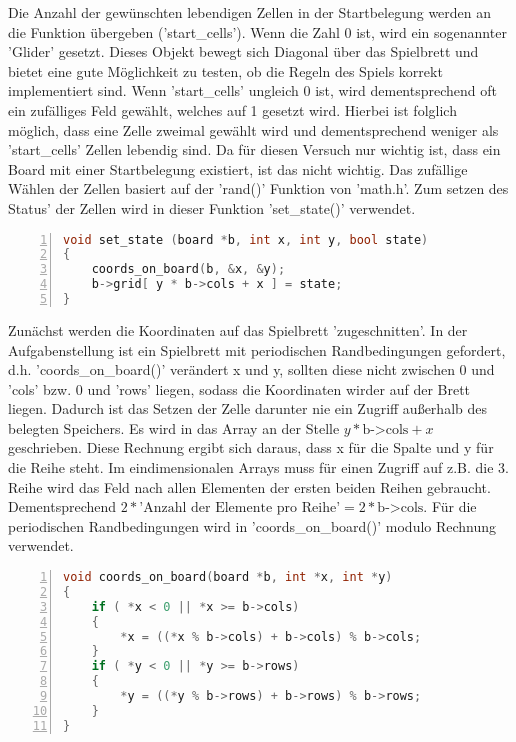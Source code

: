 \documentclass[plainarticle,zihtitle,german,final,hyperref,utf8]{zihpub}
\begin{document}
Die Anzahl der gewünschten lebendigen Zellen in der Startbelegung werden an die Funktion übergeben ('start\_cells'). Wenn die Zahl 0 ist, wird ein sogenannter 'Glider' gesetzt. Dieses Objekt bewegt sich Diagonal über das Spielbrett und bietet eine gute Möglichkeit zu testen, ob die Regeln des Spiels korrekt implementiert sind. Wenn 'start\_cells' ungleich 0 ist, wird dementsprechend oft ein zufälliges Feld gewählt, welches auf 1 gesetzt wird. Hierbei ist folglich möglich, dass eine Zelle zweimal gewählt wird und dementsprechend weniger als 'start\_cells' Zellen lebendig sind. Da für diesen Versuch nur wichtig ist, dass ein Board mit einer Startbelegung existiert, ist das nicht wichtig. Das zufällige Wählen der Zellen basiert auf der 'rand()' Funktion von 'math.h'.\newline
Zum setzen des Status' der Zellen wird in dieser Funktion 'set\_state()' verwendet.
\begin{lstlisting}[language=c, numbers=left]
void set_state (board *b, int x, int y, bool state)
{
	coords_on_board(b, &x, &y);
	b->grid[ y * b->cols + x ] = state;
}
\end{lstlisting}\label{code:set_state}
Zunächst werden die Koordinaten auf das Spielbrett 'zugeschnitten'. In der Aufgabenstellung ist ein Spielbrett mit periodischen Randbedingungen gefordert, d.h. 'coords\_on\_board()' verändert x und y, sollten diese nicht zwischen 0 und 'cols' bzw. 0 und 'rows' liegen, sodass die Koordinaten wirder auf der Brett liegen.\newline
Dadurch ist das Setzen der Zelle darunter nie ein Zugriff außerhalb des belegten Speichers. Es wird in das Array an der Stelle \begin{math}y*\text{b->cols} + x\end{math} geschrieben. Diese Rechnung ergibt sich daraus, dass x für die Spalte und y für die Reihe steht. Im eindimensionalen Arrays muss für einen Zugriff auf z.B. die 3. Reihe wird das Feld nach allen Elementen der ersten beiden Reihen gebraucht. Dementsprechend \begin{math}2*\text{'Anzahl der Elemente pro Reihe'}=2*\text{b->cols}\end{math}.\newline
Für die periodischen Randbedingungen wird in 'coords\_on\_board()' modulo Rechnung verwendet.
\begin{lstlisting}[language=c, numbers=left]
void coords_on_board(board *b, int *x, int *y)
{
	if ( *x < 0 || *x >= b->cols)
	{
		*x = ((*x % b->cols) + b->cols) % b->cols;
	}
	if ( *y < 0 || *y >= b->rows)
	{
		*y = ((*y % b->rows) + b->rows) % b->rows;
	}
}
\end{lstlisting}
\end{document}

